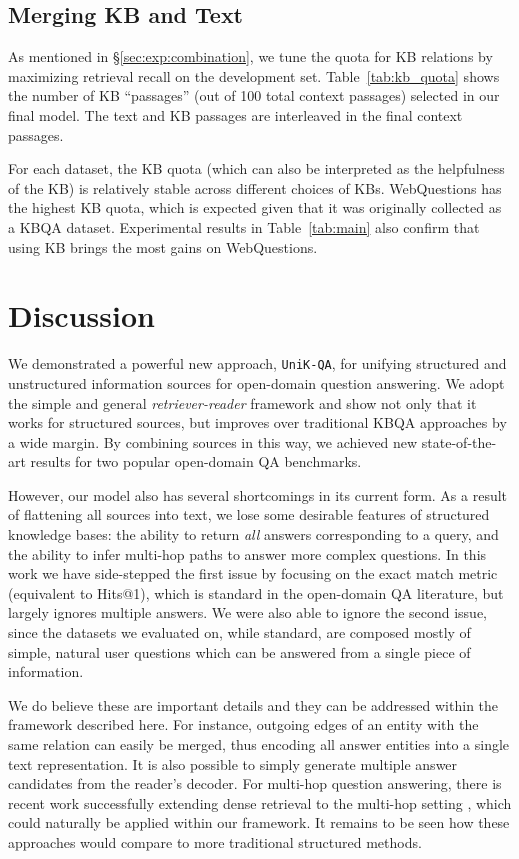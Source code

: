 \documentclass[11pt]{article}
\newcommand{\uniqa}{\texttt{UniK-QA}\xspace}
\newcommand{\secref}[1]{\S\ref{#1}}
\begin{document}
\subsection{Merging KB and Text}\label{sec:implementation:merge}

As mentioned in \secref{sec:exp:combination}, we tune the quota for KB relations by maximizing retrieval recall on the development set.
Table~\ref{tab:kb_quota} shows the number of KB ``passages'' (out of 100 total context passages) selected in our final model.
The text and KB passages are interleaved in the final context passages.

For each dataset, the KB quota (which can also be interpreted as the helpfulness of the KB) is relatively stable across different choices of KBs.
WebQuestions has the highest KB quota, which is expected given that it was originally collected as a KBQA dataset.
Experimental results in Table~\ref{tab:main} also confirm that using KB brings the most gains on WebQuestions. 
\section{Discussion}
We demonstrated a powerful new approach, \uniqa{}, for unifying structured and unstructured information sources for open-domain question answering.  We adopt the simple and general \emph{retriever-reader} framework and show not only that it works for structured sources, but improves over traditional KBQA approaches by a wide margin.  By combining sources in this way, we achieved new state-of-the-art results for two popular open-domain QA benchmarks.

However, our model also has several shortcomings in its current form.  As a result of flattening all sources into text, we lose some desirable features of structured knowledge bases:  the ability to return \emph{all} answers corresponding to a query, and the ability to infer multi-hop paths to answer more complex questions.  In this work we have side-stepped the first issue by focusing on the exact match metric (equivalent to  Hits@1), which is standard in the open-domain QA literature, but largely ignores multiple answers.  We were also able to ignore the second issue, since the datasets we evaluated on, while standard, are composed mostly of simple, natural user questions which can be answered from a single piece of information.

We do believe these are important details and they can be addressed within the framework described here. For instance, outgoing edges of an entity with the same relation can easily be merged, thus encoding all answer entities into a single text representation.  It is also possible to simply generate multiple answer candidates from the reader's decoder.  For multi-hop question answering, there is recent work \citep{xiong2020answering} successfully extending dense retrieval to the multi-hop setting \citep{yang-etal-2018-hotpotqa, welbl-etal-2018-constructing}, which could naturally be applied within our framework.  It remains to be seen how these approaches would compare to more traditional structured methods. 

 

\end{document}
